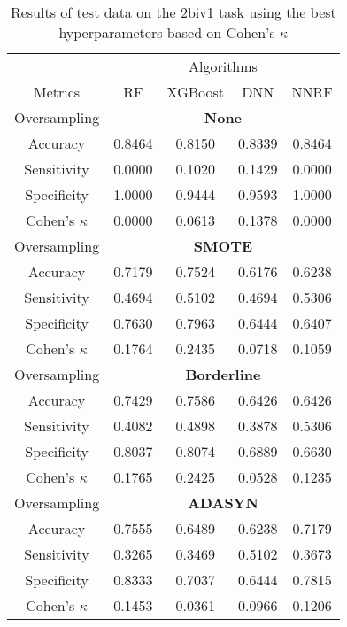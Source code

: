 \begin{table}[!htb]
\centering
\caption{Results of test data on the 2biv1 task using the best hyperparameters based on Cohen's $\kappa$}
\label{tab:2biv1_test_results}
\begin{tabular}{c | c c c c}
\hline
 & \multicolumn{4}{c}{Algorithms}\\ 
Metrics &RF & XGBoost & DNN & NNRF\\ 
\hline
Oversampling &\multicolumn{4}{|c}{\textbf{None}}\\ 
\hline
Accuracy & 0.8464 & 0.8150 & 0.8339 & 0.8464\\ 
Sensitivity & 0.0000 & 0.1020 & 0.1429 & 0.0000\\ 
Specificity & 1.0000 & 0.9444 & 0.9593 & 1.0000\\ 
Cohen's $\kappa$ & 0.0000 & 0.0613 & 0.1378 & 0.0000\\ 
\hline
Oversampling &\multicolumn{4}{|c}{\textbf{SMOTE}}\\ 
\hline
Accuracy & 0.7179 & 0.7524 & 0.6176 & 0.6238\\ 
Sensitivity & 0.4694 & 0.5102 & 0.4694 & 0.5306\\ 
Specificity & 0.7630 & 0.7963 & 0.6444 & 0.6407\\ 
Cohen's $\kappa$ & 0.1764 & 0.2435 & 0.0718 & 0.1059\\ 
\hline
Oversampling &\multicolumn{4}{|c}{\textbf{Borderline}}\\ 
\hline
Accuracy & 0.7429 & 0.7586 & 0.6426 & 0.6426\\ 
Sensitivity & 0.4082 & 0.4898 & 0.3878 & 0.5306\\ 
Specificity & 0.8037 & 0.8074 & 0.6889 & 0.6630\\ 
Cohen's $\kappa$ & 0.1765 & 0.2425 & 0.0528 & 0.1235\\ 
\hline
Oversampling &\multicolumn{4}{|c}{\textbf{ADASYN}}\\ 
\hline
Accuracy & 0.7555 & 0.6489 & 0.6238 & 0.7179\\ 
Sensitivity & 0.3265 & 0.3469 & 0.5102 & 0.3673\\ 
Specificity & 0.8333 & 0.7037 & 0.6444 & 0.7815\\ 
Cohen's $\kappa$ & 0.1453 & 0.0361 & 0.0966 & 0.1206\\ 
\hline
\end{tabular}
\end{table}


